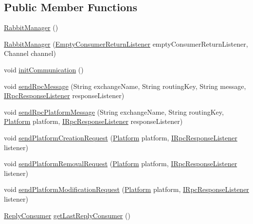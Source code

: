 \subsection*{Public Member Functions}
\begin{DoxyCompactItemize}
\item 
\hyperlink{classeu_1_1h2020_1_1symbiote_1_1communication_1_1RabbitManager_af32aa97329fd60a0c4d158d13a261b30}{Rabbit\+Manager} ()
\item 
\hyperlink{classeu_1_1h2020_1_1symbiote_1_1communication_1_1RabbitManager_add62f0a65b573c741e8cf0e1bbc44a44}{Rabbit\+Manager} (\hyperlink{classeu_1_1h2020_1_1symbiote_1_1communication_1_1EmptyConsumerReturnListener}{Empty\+Consumer\+Return\+Listener} empty\+Consumer\+Return\+Listener, Channel channel)
\item 
void \hyperlink{classeu_1_1h2020_1_1symbiote_1_1communication_1_1RabbitManager_a30abf6a670122eb22a8105a206858616}{init\+Communication} ()
\item 
void \hyperlink{classeu_1_1h2020_1_1symbiote_1_1communication_1_1RabbitManager_a200f6aba21764770f8526f0682b08f1c}{send\+Rpc\+Message} (String exchange\+Name, String routing\+Key, String message, \hyperlink{interfaceeu_1_1h2020_1_1symbiote_1_1communication_1_1IRpcResponseListener}{I\+Rpc\+Response\+Listener} response\+Listener)
\item 
void \hyperlink{classeu_1_1h2020_1_1symbiote_1_1communication_1_1RabbitManager_a9dd2b250640a13346fabfba81ae22a07}{send\+Rpc\+Platform\+Message} (String exchange\+Name, String routing\+Key, \hyperlink{classeu_1_1h2020_1_1symbiote_1_1model_1_1Platform}{Platform} platform, \hyperlink{interfaceeu_1_1h2020_1_1symbiote_1_1communication_1_1IRpcResponseListener}{I\+Rpc\+Response\+Listener} response\+Listener)
\item 
void \hyperlink{classeu_1_1h2020_1_1symbiote_1_1communication_1_1RabbitManager_ac960f5c05843849848d650e49ef25ae9}{send\+Platform\+Creation\+Request} (\hyperlink{classeu_1_1h2020_1_1symbiote_1_1model_1_1Platform}{Platform} platform, \hyperlink{interfaceeu_1_1h2020_1_1symbiote_1_1communication_1_1IRpcResponseListener}{I\+Rpc\+Response\+Listener} listener)
\item 
void \hyperlink{classeu_1_1h2020_1_1symbiote_1_1communication_1_1RabbitManager_a7e730a2a9c5d62e5d3ff99fe28e23384}{send\+Platform\+Removal\+Request} (\hyperlink{classeu_1_1h2020_1_1symbiote_1_1model_1_1Platform}{Platform} platform, \hyperlink{interfaceeu_1_1h2020_1_1symbiote_1_1communication_1_1IRpcResponseListener}{I\+Rpc\+Response\+Listener} listener)
\item 
void \hyperlink{classeu_1_1h2020_1_1symbiote_1_1communication_1_1RabbitManager_a0ffb60c722cea85703dabfa6dbd6f18e}{send\+Platform\+Modification\+Request} (\hyperlink{classeu_1_1h2020_1_1symbiote_1_1model_1_1Platform}{Platform} platform, \hyperlink{interfaceeu_1_1h2020_1_1symbiote_1_1communication_1_1IRpcResponseListener}{I\+Rpc\+Response\+Listener} listener)
\item 
\hyperlink{classeu_1_1h2020_1_1symbiote_1_1communication_1_1ReplyConsumer}{Reply\+Consumer} \hyperlink{classeu_1_1h2020_1_1symbiote_1_1communication_1_1RabbitManager_a2b34a47ec1e4a0e359f81e81f8d8b693}{get\+Last\+Reply\+Consumer} ()
\end{DoxyCompactItemize}
